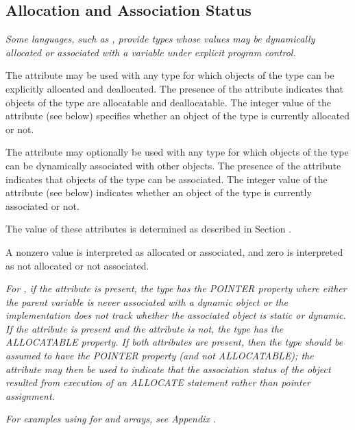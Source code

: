 \subsection{Allocation and Association Status}
\label{chap:allocationandassociationstatus}

\textit{Some languages, such as ,
provide types whose values
may be dynamically allocated or associated with a variable
under explicit program control.}

\hypertarget{chap:DWATallocatedallocationstatusoftypes}{}
The \DWATallocatedDEFN{} attribute
may be used with any
type for which objects of the type can be explicitly allocated
and deallocated. The presence of the attribute indicates that
objects of the type are allocatable and deallocatable. The
integer value of the attribute (see below) specifies whether
an object of the type is 
currently allocated or not.

\hypertarget{chap:DWATassociatedassociationstatusoftypes}{}
The 
\DWATassociatedDEFN{} attribute 
may 
optionally be used with
any type for which objects of the type can be dynamically
associated with other objects. The presence of the attribute
indicates that objects of the type can be associated. The
integer value of the attribute (see below) indicates whether
an object of the type is currently associated or not.

The value of these attributes is determined as described in
Section .

A non\dash zero value is interpreted as allocated or associated,
and zero is interpreted as not allocated or not associated.

\textit{For , 
if the \DWATassociated{} 
attribute is present,
the type has the POINTER property where either the parent
variable is never associated with a dynamic object or the
implementation does not track whether the associated object
is static or dynamic. If the \DWATallocated{} attribute is
present and the \DWATassociated{} attribute is not, the type
has the ALLOCATABLE property. If both attributes are present,
then the type should be assumed to have the POINTER property
(and not ALLOCATABLE); the \DWATallocated{} attribute may then
be used to indicate that the association status of the object
resulted from execution of an ALLOCATE statement rather than
pointer assignment.}

\textit{For examples using 
\DWATallocated{} for  and 
arrays, 
see Appendix .}

